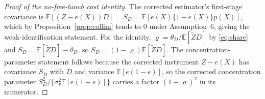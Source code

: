 \documentclass[11pt]{article}
\theoremstyle{plain}
\theoremstyle{definition}
\newcommand{\E}{\mathbb{E}}
\newcommand{\Zt}{\tilde{Z}}
\begin{document}
\begin{proof}[Proof of the no-free-lunch cost identity]
The corrected estimator's first-stage covariance is $\E[(Z-e(X))D]=S_D=\E[e(X)\{1-e(X)\}p(X)]$, which by Proposition~\ref{prop:collim} tends to $0$ under Assumption~6, giving the weak-identification statement. For the identity, $\varrho=\theta_D/\E[\Zt D]$ by \eqref{eq:share} and $S_D=\E[\Zt D]-\theta_D$, so $S_D=(1-\varrho)\E[\Zt D]$. The concentration-parameter statement follows because the corrected instrument $Z-e(X)$ has covariance $S_D$ with $D$ and variance $\E[e(1-e)]$, so the corrected concentration parameter $S_D^2/\{\sigma_v^2\E[e(1-e)]\}$ carries a factor $(1-\varrho)^2$ in its numerator.
\end{proof}
\end{document}
